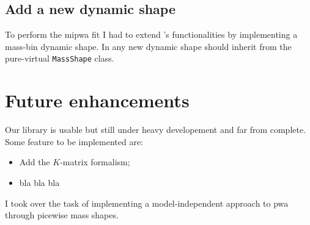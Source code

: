         \subsection{Add a new dynamic shape}

            To perform the \ac{mipwa} fit I had to extend 's functionalities by implementing a mass-bin dynamic shape.
            In  any new dynamic shape should inherit from the pure-virtual \lstinline!MassShape! class.
            
        


%
%
%


    \section{Future enhancements}
    Our library is usable but still under heavy developement and far from complete.
    Some feature to be implemented are:
    \begin{itemize}
        \item Add the $K$-matrix formalism;
        \item bla bla bla
    \end{itemize}

    
    
    I took over the task of implementing a model-independent approach to \ac{pwa} through picewise mass shapes.




